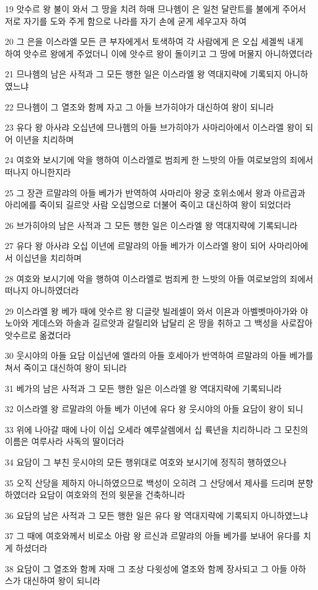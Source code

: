 \par 19 앗수르 왕 불이 와서 그 땅을 치려 하매 므나헴이 은 일천 달란트를 불에게 주어서 저로 자기를 도와 주게 함으로 나라를 자기 손에 굳게 세우고자 하여
\par 20 그 은을 이스라엘 모든 큰 부자에게서 토색하여 각 사람에게 은 오십 세겔씩 내게 하여 앗수르 왕에게 주었더니 이에 앗수르 왕이 돌이키고 그 땅에 머물지 아니하였더라
\par 21 므나헴의 남은 사적과 그 모든 행한 일은 이스라엘 왕 역대지략에 기록되지 아니하였느냐
\par 22 므나헴이 그 열조와 함께 자고 그 아들 브가히야가 대신하여 왕이 되니라
\par 23 유다 왕 아사랴 오십년에 므나헴의 아들 브가히야가 사마리아에서 이스라엘 왕이 되어 이년을 치리하며
\par 24 여호와 보시기에 악을 행하여 이스라엘로 범죄케 한 느밧의 아들 여로보암의 죄에서 떠나지 아니한지라
\par 25 그 장관 르말랴의 아들 베가가 반역하여 사마리아 왕궁 호위소에서 왕과 아르곱과 아리에를 죽이되 길르앗 사람 오십명으로 더불어 죽이고 대신하여 왕이 되었더라
\par 26 브가히야의 남은 사적과 그 모든 행한 일은 이스라엘 왕 역대지략에 기록되니라
\par 27 유다 왕 아사랴 오십 이년에 르말랴의 아들 베가가 이스라엘 왕이 되어 사마리아에서 이십년을 치리하며
\par 28 여호와 보시기에 악을 행하여 이스라엘로 범죄케 한 느밧의 아들 여로보암의 죄에서 떠나지 아니하였더라
\par 29 이스라엘 왕 베가 때에 앗수르 왕 디글랏 빌레셀이 와서 이욘과 아벨벳마아가와 야노아와 게데스와 하솔과 길르앗과 갈릴리와 납달리 온 땅을 취하고 그 백성을 사로잡아 앗수르로 옮겼더라
\par 30 웃시야의 아들 요담 이십년에 엘라의 아들 호세아가 반역하여 르말랴의 아들 베가를 쳐서 죽이고 대신하여 왕이 되니라
\par 31 베가의 남은 사적과 그 모든 행한 일은 이스라엘 왕 역대지략에 기록되니라
\par 32 이스라엘 왕 르말랴의 아들 베가 이년에 유다 왕 웃시야의 아들 요담이 왕이 되니
\par 33 위에 나아갈 때에 나이 이십 오세라 예루살렘에서 십 륙년을 치리하니라 그 모친의 이름은 여루사라 사독의 딸이더라
\par 34 요담이 그 부친 웃시야의 모든 행위대로 여호와 보시기에 정직히 행하였으나
\par 35 오직 산당을 제하지 아니하였으므로 백성이 오히려 그 산당에서 제사를 드리며 분향하였더라 요담이 여호와의 전의 윗문을 건축하니라
\par 36 요담의 남은 사적과 그 모든 행한 일은 유다 왕 역대지략에 기록되지 아니하였느냐
\par 37 그 때에 여호와께서 비로소 아람 왕 르신과 르말랴의 아들 베가를 보내어 유다를 치게 하셨더라
\par 38 요담이 그 열조와 함께 자매 그 조상 다윗성에 열조와 함께 장사되고 그 아들 아하스가 대신하여 왕이 되니라

